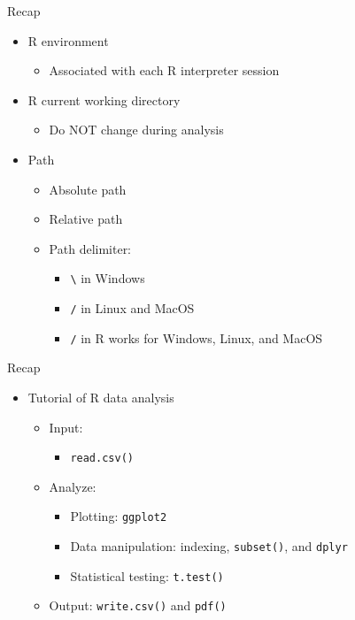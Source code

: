\documentclass[12pt, t, xcolor=dvipsnames]{beamer}
\newcommand{\code}[1]{\colorbox{codegray}{\textcolor{black!95}{\texttt{#1}}}}
\begin{document}
\begin{frame}{Recap}
  \begin{itemize}
    \item R environment
    \begin{itemize}
      \item Associated with each R interpreter session
    \end{itemize}
    
    \item R current working directory
    \begin{itemize}
      \item Do \alert{NOT} change during analysis
    \end{itemize}
    
    \item Path
    \begin{itemize}
      \item Absolute path
      \item Relative path
      \item Path delimiter:
      \begin{itemize}
        \item \code{\textbackslash} in Windows
        \item \code{/} in Linux and MacOS
        \item \code{/} in R works for Windows, Linux, and MacOS
      \end{itemize}

    \end{itemize}
  \end{itemize}
\end{frame}

\begin{frame}{Recap}
  \begin{itemize}
    \item Tutorial of R data analysis
    \begin{itemize}
      \item Input: 
      \begin{itemize}
        \item \code{read.csv()}
      \end{itemize}
      
      \item Analyze: 
      \begin{itemize}
        \item Plotting: \code{ggplot2}
        \item Data manipulation: indexing, \code{subset()}, and \code{dplyr}
        \item Statistical testing: \code{t.test()}
      \end{itemize}
      
      \item Output: \code{write.csv()} and \code{pdf()}
    \end{itemize}

  \end{itemize}

\end{frame}
\end{document}
